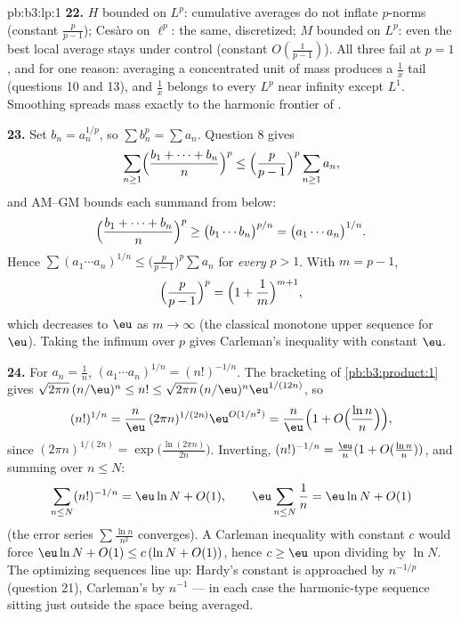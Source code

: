 \begin{solution}{pb:b3:lp:1}
\textbf{22.} $H$ bounded on $L^p$: cumulative averages do
not inflate $p$-norms (constant $\frac p{p-1}$); Ces\`aro on
$\ell^p$: the same, discretized; $M$ bounded on $L^p$: even
the best local average stays under control (constant
$O(\frac1{p-1})$). All three fail at $p = 1$, and for one
reason: averaging a concentrated unit of mass produces a
$\frac1x$ tail (questions 10 and 13), and $\frac1x$ belongs
to every $L^p$ near infinity except $L^1$. Smoothing spreads
mass exactly to the harmonic frontier of .

\textbf{23.} Set $b_n = a_n^{1/p}$, so $\sum b_n^p = \sum
a_n$. Question 8 gives
\[
\sum_{n\geq1}\Bigl(\frac{b_1 + \dots + b_n}n\Bigr)^{p}
\leq \Bigl(\frac p{p-1}\Bigr)^{p}\sum_{n\geq1}a_n,
\]
and AM--GM bounds each summand from below:
\[
\Bigl(\frac{b_1 + \dots + b_n}n\Bigr)^{p}
\geq \bigl(b_1\cdots b_n\bigr)^{p/n}
= \bigl(a_1\cdots a_n\bigr)^{1/n}.
\]
Hence $\sum(a_1\cdots a_n)^{1/n} \leq \bigl(\frac
p{p-1}\bigr)^p\sum a_n$ for \emph{every} $p > 1$. With $m =
p - 1$,
\[
\Bigl(\frac p{p-1}\Bigr)^{p} =
\Bigl(1 + \frac1m\Bigr)^{m+1},
\]
which decreases to $\eu$ as $m \to \infty$ (the classical
monotone upper sequence for $\eu$). Taking the infimum over
$p$ gives Carleman's inequality with constant $\eu$.

\textbf{24.} For $a_n = \frac1n$, $(a_1\cdots a_n)^{1/n} =
(n!)^{-1/n}$. The bracketing of \cref{pb:b3:product:1} gives
$\sqrt{2\pi n}\,(n/\eu)^n \leq n! \leq \sqrt{2\pi
n}\,(n/\eu)^n\eu^{1/(12n)}$, so
\[
(n!)^{1/n} = \frac n\eu\,(2\pi n)^{1/(2n)}
\eu^{O(1/n^2)}
= \frac n\eu\Bigl(1 +
O\Bigl(\frac{\ln n}{n}\Bigr)\Bigr),
\]
since $(2\pi n)^{1/(2n)} = \exp\bigl(\frac{\ln(2\pi
n)}{2n}\bigr)$. Inverting, $(n!)^{-1/n} = \frac\eu n(1 +
O(\frac{\ln n}n))$, and summing over $n \leq N$:
\[
\sum_{n\leq N}(n!)^{-1/n}
= \eu\ln N + O(1),
\qquad
\eu\sum_{n\leq N}\frac1n = \eu\ln N + O(1)
\]
(the error series $\sum\frac{\ln n}{n^2}$ converges). A
Carleman inequality with constant $c$ would force $\eu\ln N
+ O(1) \leq c\,(\ln N + O(1))$, hence $c \geq \eu$ upon
dividing by $\ln N$. The optimizing sequences line up:
Hardy's constant is approached by $n^{-1/p}$ (question 21),
Carleman's by $n^{-1}$ --- in each case the harmonic-type
sequence sitting just outside the space being averaged.


\end{solution}
